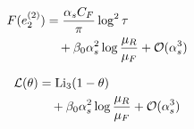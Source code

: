 \begin{align}
  F(e_2^{(2)}) &= \frac{\alpha_s C_F}{\pi} \log^2 \tau \nonumber \\
  &\quad + \beta_0 \alpha_s^2 \log\frac{\mu_R}{\mu_F} + \mathcal{O}(\alpha_s^3) \label{eq:2}
\end{align}

\begin{align}
  \mathcal{L}(\theta) &= \mathrm{Li}_{3}(1 - \theta) \nonumber \\
  &\quad + \beta_0 \alpha_s^2 \log\frac{\mu_R}{\mu_F} + \mathcal{O}(\alpha_s^3) \label{eq:3}
\end{align}

